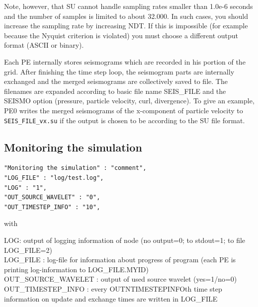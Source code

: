 \documentclass{hitec}
\begin{document}
Note, however, that SU cannot handle sampling rates smaller than 1.0e-6 seconds and the number of samples is limited to about 32.000. In such cases, you should increase the sampling rate by increasing NDT. If this is impossible (for example because the Nyquist criterion is violated) you must choose a different output format (ASCII or binary).

Each PE internally stores seismograms which are recorded in his portion of the grid. After finishing the time step loop, the seismogram parts are internally exchanged and the merged seismograms are collectively saved to file. The filenames are expanded according to basic file name SEIS\_FILE and the SEISMO option (pressure, particle velocity, curl, divergence). To give an example, PE0 writes the merged seismograms of the x-component of particle velocity to  \lstinline{SEIS_FILE_vx.su} if the output is chosen to be according to the SU file format. 


\subsection{Monitoring the simulation}
\begin{verbatim}
"Monitoring the simulation" : "comment",
"LOG_FILE" : "log/test.log",
"LOG" : "1",
"OUT_SOURCE_WAVELET" : "0",
"OUT_TIMESTEP_INFO" : "10",

\end{verbatim}

with

LOG: output of logging information of node (no output=0; to stdout=1; to file LOG\_FILE=2)\\
LOG\_FILE : log-file for information about progress of program (each PE is printing log-information to LOG\_FILE.MYID) \\
OUT\_SOURCE\_WAVELET : output of used source wavelet (yes=1/no=0) \\
OUT\_TIMESTEP\_INFO : every OUTNTIMESTEPINFOth time step information on update and exchange times are written in LOG\_FILE 
\end{document}
